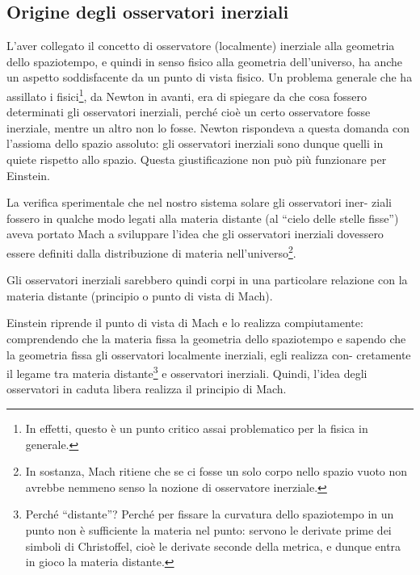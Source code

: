 \subsection{Origine degli osservatori inerziali}
L'aver collegato il concetto di osservatore (localmente) inerziale alla geometria 
dello spaziotempo, e quindi in senso fisico alla geometria dell'universo,
ha anche un aspetto soddisfacente da un punto di vista fisico. Un problema
generale che ha assillato i fisici\footnote{In effetti, questo è un punto critico assai problematico 
per la fisica in generale.},
da Newton in avanti, era di spiegare da che cosa fossero determinati gli osservatori 
inerziali, perché cioè un certo osservatore fosse inerziale, mentre un altro non lo fosse. 
Newton rispondeva a
questa domanda con l'assioma dello spazio assoluto: gli osservatori inerziali
sono dunque quelli in quiete rispetto allo spazio. Questa giustificazione non
può più funzionare per Einstein.

La verifica sperimentale che nel nostro sistema solare gli osservatori iner-
ziali fossero in qualche modo legati alla materia distante (al ``cielo delle stelle
fisse'') aveva portato Mach a sviluppare l'idea che gli osservatori inerziali 
dovessero essere definiti dalla distribuzione di materia nell'universo\footnote{
In sostanza, Mach ritiene che se ci fosse un solo corpo nello spazio vuoto non avrebbe
nemmeno senso la nozione di osservatore inerziale.}. 

Gli osservatori inerziali sarebbero quindi corpi in una particolare relazione con 
la materia distante (principio o punto di vista di Mach).

Einstein riprende il punto di vista di Mach e lo realizza compiutamente:
comprendendo che la materia fissa la geometria dello spaziotempo e sapendo
che la geometria fissa gli osservatori localmente inerziali, egli realizza con-
cretamente il legame tra materia distante\footnote{
Perché ``distante''? Perché per fissare la curvatura dello spaziotempo in un punto non
è sufficiente la materia nel punto: servono le derivate prime dei simboli di Christoffel, cioè
le derivate seconde della metrica, e dunque entra in gioco la materia distante.} 
e osservatori inerziali. Quindi, l'idea degli osservatori in caduta libera realizza il principio di Mach.

